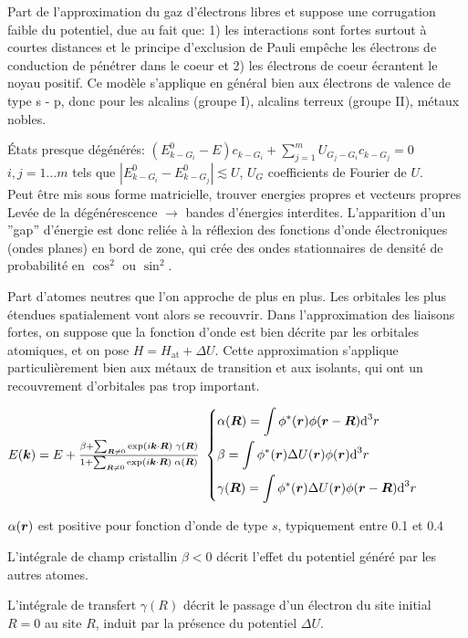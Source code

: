Part de l'approximation du gaz d'électrons libres et suppose une corrugation faible du potentiel, due au fait que: 
1) les interactions sont fortes surtout à courtes distances et le principe d'exclusion de Pauli empêche les électrons de conduction de pénétrer dans le coeur et 
2) les électrons de coeur écrantent le noyau positif. Ce modèle s'applique en général bien aux électrons de valence de type s - p, donc pour les alcalins (groupe I), alcalins terreux (groupe II), métaux nobles.
\begin{squishlist}
    \item États presque dégénérés: $(E_{k-G_i}^0 - E) c_{k-G_i} + \sum_{j=1}^m U_{G_j - G_i} c_{k-G_j} = 0$ \\
    $i,j = 1 \ldots m$ tels que $|E_{k-G_i}^0 - E_{k-G_j}^0| \lesssim U$, \quad $U_G$ coefficients de Fourier de $U$. \\
    Peut être mis sous forme matricielle, trouver energies propres et vecteurs propres \\
    Levée de la dégénérescence $\rightarrow$ bandes d'énergies interdites.
    L’apparition d’un ”gap” d’énergie est donc reliée à la réflexion des fonctions d’onde électroniques (ondes planes) en bord de zone, qui crée des ondes
    stationnaires de densité de probabilité en $\cos^2$ ou $\sin^2$.
\end{squishlist}

Part d'atomes neutres que l'on approche de plus en plus.
Les orbitales les plus étendues spatialement vont alors se recouvrir. Dans l'approximation
des liaisons fortes, on suppose que la fonction d'onde est bien décrite par les orbitales
atomiques, et on pose $H = H_{\text{at}} + \Delta U$. 
Cette approximation s'applique particulièrement
bien aux métaux de transition et aux isolants, qui ont un recouvrement d'orbitales pas
trop important.
\begin{squishlist}
    \item $E(\bm{k}) = E + \frac{\beta + \sum_{\bm{R} \neq 0}\exp(i\bm{k} \cdot \bm{R}) \; \gamma(\bm{R})}{1 + \sum_{\bm{R} \neq 0}\exp(i\bm{k} \cdot \bm{R})\; \alpha(\bm{R})}$
    $\left\{ \begin{aligned}
        & \alpha(\bm{R}) = \int \phi^*(\bm{r})\phi(\bm{r} - \bm{R}) \textrm{d}^3 r \\
        & \beta = \int \phi^*(\bm{r})\Delta U (\bm{r}) \phi(\bm{r}) \textrm{d}^3 r \\
        & \gamma(\bm{R}) = \int \phi^*(\bm{r})\Delta U (\bm{r}) \phi(\bm{r} - \bm{R}) \textrm{d}^3 r
    \end{aligned} \right.$
    \item $\alpha(\bm{r})$ est positive pour fonction d'onde de type $s$, typiquement entre 0.1 et 0.4
    \item L'intégrale de champ cristallin $\beta < 0$ décrit l'effet du potentiel généré par les autres atomes.
    \item L'intégrale de transfert $\gamma(R)$ décrit le passage d'un électron du site initial $R = 0$ au site $R$, induit par la présence du potentiel $\Delta U$.
\end{squishlist}

